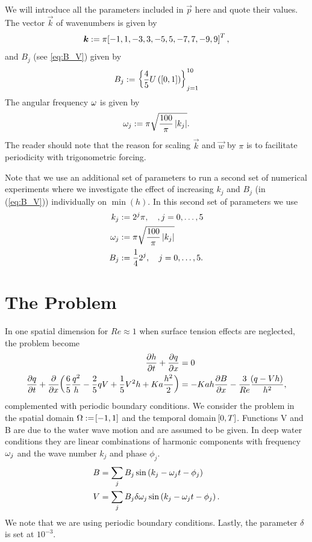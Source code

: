 \documentclass{amsart}
\theoremstyle{definition}
\theoremstyle{remark}
\numberwithin{equation}{section}
\begin{document}
We will introduce all the parameters included in $\vec{p}$ here and quote their values. The  vector $\vec k$ of wavenumbers is given by
\begin{equation}
\boldsymbol{k}:=\pi\!\left[{-1,1,-3,3,-5,5,-7,7,-9,9}\right]^T,
\end{equation}
and $B_j$ (see \ref{eq:B_V}) given by 
\begin{equation}
B_j:= \left\lbrace\frac{4}{5}U\left([0,1]\right)\right\rbrace_{j=1}^{10}
\end{equation}
The angular frequency $\omega$ is given by 
\begin{equation}
\omega_j :=\pi \sqrt{\frac{100}{\pi}\left|k_j\right|}.
\end{equation}
The reader should note that the reason for scaling $\vec{k}$ and $\vec{w}$ by $\pi$ is to  facilitate  periodicity with trigonometric forcing.
\begin{Rem} Note that we use an additional  set of parameters to run a second set of numerical experiments where we investigate the effect of increasing $k_j$ and $B_j$ (in (\ref{eq:B_V})) individually on $\min(h)$.  In this second set of parameters we use
	\begin{equation}\label{eq:second_parameter_set}
\begin{aligned}
{k}_j&:=2^j\pi,\quad, j=0,\dots,5\\
\omega_j &:=\pi \sqrt{\frac{100}{\pi}\left|k_j\right|}\\
B_j&:=\frac{1}{4}2^j,\quad j = 0,\dots,5.
\end{aligned}
	\end{equation}
\end{Rem}

\section{The Problem}
In one spatial dimension for $Re\approx 1$ when surface tension effects are neglected, the problem become
\begin{equation}
\begin{aligned}
\frac{\partial h}{\partial t} + \frac{\partial q}{\partial x}&=0\\
\frac{\partial q}{\partial t} + \frac{\partial }{\partial x}\!\left({\frac{6}{5}\frac{q^2}{h}-\frac{2}{5}qV+\frac{1}{5}V^2h+Ka\frac{h^2}{2}}\right)&=-Kah\frac{\partial B}{\partial x}-\frac{3}{Re}\frac{\!\left({q-Vh}\right)}{h^2},
\end{aligned}
\end{equation}
 complemented with periodic boundary conditions. We consider the problem in the spatial domain $\Omega:=\!\left[{-1,1}\right]$ and the temporal domain $\!\left[{0,T}\right]$. Functions V and B are due to the water wave motion and are assumed to be given.  In deep water conditions they are linear combinations of harmonic components with frequency $\omega_j$ and the wave number $k_j$ and phase $\phi_j$.
 \begin{equation}\label{eq:B_V}
\begin{aligned}
B&=\sum_jB_j\operatorname{sin}\left(k_j-\omega_jt-\phi_j\right)\\
V&=\sum_jB_j\delta\omega_j\operatorname{sin}\left(k_j-\omega_jt-\phi_j\right).
\end{aligned}
 \end{equation}
We note that we are using periodic boundary conditions.  Lastly, the parameter $\delta$ is set at $10^{-3}$.
\end{document}
